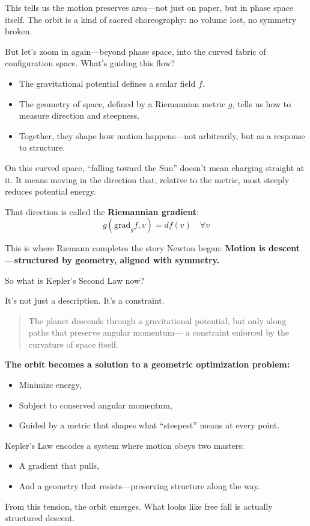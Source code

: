 This tells us the motion preserves area—not just on paper, but in phase space itself. The orbit is a kind of sacred choreography: no volume lost, no symmetry broken.

But let’s zoom in again—beyond phase space, into the curved fabric of configuration space. What’s guiding this flow?

\begin{itemize}
  \item The gravitational potential defines a scalar field \( f \).
  \item The geometry of space, defined by a Riemannian metric \( g \), tells us how to measure direction and steepness.
  \item Together, they shape how motion happens—not arbitrarily, but as a response to structure.
\end{itemize}

On this curved space, “falling toward the Sun” doesn’t mean charging straight at it. It means moving in the direction that, relative to the metric, most steeply reduces potential energy.

That direction is called the \textbf{Riemannian gradient}:
\[
g(\text{grad}_g f, v) = df(v) \quad \forall v
\]

This is where Riemann completes the story Newton began:  
\textbf{Motion is descent—structured by geometry, aligned with symmetry.}

So what is Kepler’s Second Law now?

It’s not just a description. It’s a constraint.

\begin{quote}
The planet descends through a gravitational potential,  
but only along paths that preserve angular momentum—  
a constraint enforced by the curvature of space itself.
\end{quote}

\textbf{The orbit becomes a solution to a geometric optimization problem:}

\begin{itemize}
  \item Minimize energy,  
  \item Subject to conserved angular momentum,  
  \item Guided by a metric that shapes what “steepest” means at every point.
\end{itemize}

\begin{tcolorbox}[colback=blue!5!white, colframe=blue!50!black,
title={Kepler’s Law as Gradient-Constrained Motion}]
Kepler’s Law encodes a system where motion obeys two masters:

\begin{itemize}
  \item A gradient that pulls,
  \item And a geometry that resists—preserving structure along the way.
\end{itemize}

From this tension, the orbit emerges.  
What looks like free fall is actually structured descent.
\end{tcolorbox}

